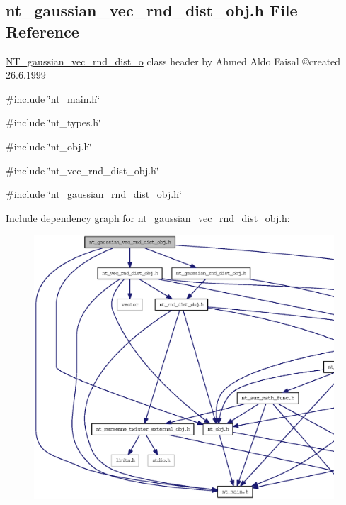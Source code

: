 \subsection{nt\_\-gaussian\_\-vec\_\-rnd\_\-dist\_\-obj.h File Reference}
\label{nt__gaussian__vec__rnd__dist__obj_8h}



\begin{DoxyItemize}
\item \hyperlink{class_n_t__gaussian__vec__rnd__dist__o}{NT\_\-gaussian\_\-vec\_\-rnd\_\-dist\_\-o} class header by Ahmed Aldo Faisal \copyright created 26.6.1999 
\end{DoxyItemize} 


{\ttfamily \#include \char`\"{}nt\_\-main.h\char`\"{}}\par
{\ttfamily \#include \char`\"{}nt\_\-types.h\char`\"{}}\par
{\ttfamily \#include \char`\"{}nt\_\-obj.h\char`\"{}}\par
{\ttfamily \#include \char`\"{}nt\_\-vec\_\-rnd\_\-dist\_\-obj.h\char`\"{}}\par
{\ttfamily \#include \char`\"{}nt\_\-gaussian\_\-rnd\_\-dist\_\-obj.h\char`\"{}}\par
Include dependency graph for nt\_\-gaussian\_\-vec\_\-rnd\_\-dist\_\-obj.h:
\nopagebreak
\begin{figure}[H]
\begin{center}
\leavevmode
\includegraphics[width=400pt]{nt__gaussian__vec__rnd__dist__obj_8h__incl}
\end{center}
\end{figure}
